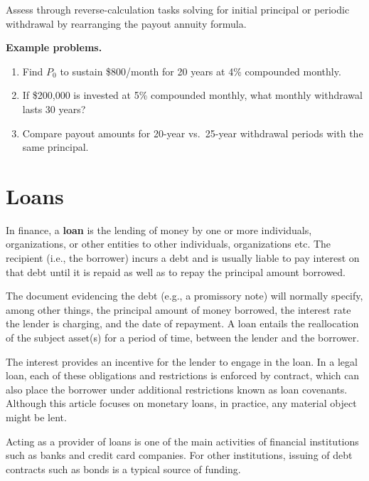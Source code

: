 Assess through reverse-calculation tasks solving for initial principal
or periodic withdrawal by rearranging the payout annuity formula.

\textbf{Example problems.}
\begin{enumerate}
    \item Find $P_0$ to sustain \$800/month for 20 years at 4\%
          compounded monthly.
    \item If \$200{,}000 is invested at 5\% compounded monthly, what
          monthly withdrawal lasts 30 years?
    \item Compare payout amounts for 20-year vs.\ 25-year withdrawal
          periods with the same principal.
\end{enumerate}



\section{Loans}
\label{sec:loan-f806}


In finance, a \textbf{loan} is the lending of money by one or more individuals,
organizations, or other entities to other individuals, organizations etc. The recipient
(i.e., the borrower) incurs a debt and is usually liable to pay interest on that debt
until it is repaid as well as to repay the principal amount borrowed.



The document evidencing the debt (e.g., a promissory note) will normally specify, among
other things, the principal amount of money borrowed, the interest rate the lender is
charging, and the date of repayment. A loan entails the reallocation of the subject
asset(s) for a period of time, between the lender and the borrower.



The interest provides an incentive for the lender to engage in the loan. In a legal loan,
each of these obligations and restrictions is enforced by contract, which can also place
the borrower under additional restrictions known as loan covenants. Although this article
focuses on monetary loans, in practice, any material object might be lent.



Acting as a provider of loans is one of the main activities of financial institutions such
as banks and credit card companies. For other institutions, issuing of debt contracts such
as bonds is a typical source of funding.




